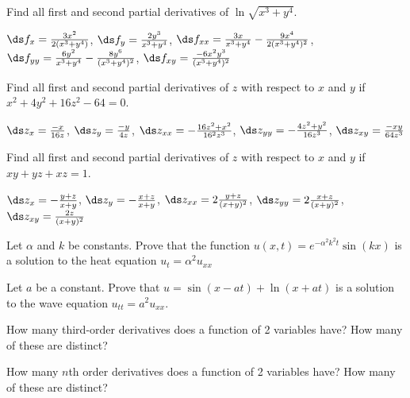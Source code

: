 \begin{enumialphparenastyle}
\begin{ex}
Find all first and second partial derivatives of
$\ln\sqrt{x^3+y^4}$.
\begin{sol}
$\ds f_x={3x^2\over2(x^3+y^4)}$, 
$\ds f_y={2y^3\over x^3+y^4}$,
$\ds f_{xx}={3x\over x^3+y^4}-{9x^4\over 2(x^3+y^4)^2}$, 
$\ds f_{yy}={6y^2\over x^3+y^4}-{8y^6\over (x^3+y^4)^2}$,\hfill\break 
$\ds f_{xy}={-6x^2y^3\over (x^3+y^4)^2}$
\end{sol}
\end{ex}

\begin{ex}
Find all first and second partial derivatives of
$z$ with respect to $x$ and $y$ if 
$x^2+4y^2+16z^2-64=0$.
\begin{sol}
$\ds z_x={-x\over16z}$, 
$\ds z_y={-y\over4z}$,\hfill\break 
$\ds z_{xx}=-{16z^2+x^2\over16^2z^3}$,\hfill\break 
$\ds z_{yy}=-{4z^2+y^2\over16z^3}$,\hfill\break 
$\ds z_{xy}={-xy\over64z^3}$
\end{sol}
\end{ex}

\begin{ex}
Find all first and second partial derivatives of
$z$ with respect to $x$ and $y$ if 
$xy+yz+xz=1$.
\begin{sol}
$\ds z_x=-{y+z\over x+y}$, 
$\ds z_y=-{x+z\over x+y}$,\hfill\break 
$\ds z_{xx}=2{y+z\over(x+y)^2}$, 
$\ds z_{yy}=2{x+z\over(x+y)^2}$,\hfill\break 
$\ds z_{xy}={2z\over(x+y)^2}$
\end{sol}
\end{ex}

\begin{ex}
Let $\alpha$ and $k$ be constants.  Prove that the function 
$u(x,t)=e^{-\alpha^2k^2t}\sin(kx)$
is a solution to the heat equation $u_t=\alpha^2u_{xx}$
\end{ex}

\begin{ex}
Let $a$ be a constant.  Prove that $u=\sin(x-at)+\ln(x+at)$ is
  a solution to the wave equation $u_{tt}=a^2u_{xx}$.

\end{ex}

\begin{ex}
How many third-order derivatives does a function of 2 variables
  have?  How many of these are distinct?
\end{ex}

\begin{ex}
How many $n$th order derivatives does a function of 2 variables
  have?  How many of these are distinct?
\end{ex}

\end{enumialphparenastyle}